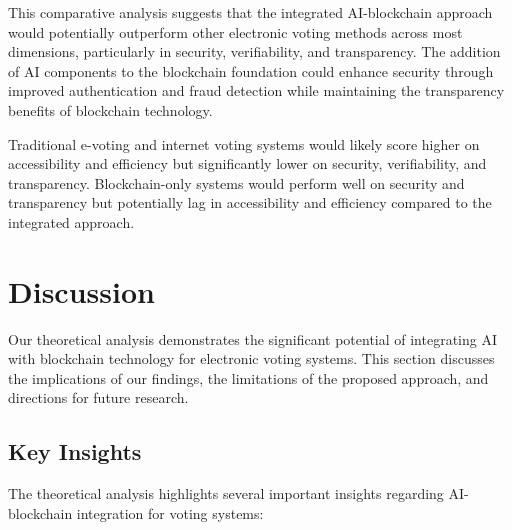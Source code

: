 \documentclass[conference]{IEEEtran}
\begin{document}
This comparative analysis suggests that the integrated AI-blockchain approach would potentially outperform other electronic voting methods across most dimensions, particularly in security, verifiability, and transparency. The addition of AI components to the blockchain foundation could enhance security through improved authentication and fraud detection while maintaining the transparency benefits of blockchain technology.

Traditional e-voting and internet voting systems would likely score higher on accessibility and efficiency but significantly lower on security, verifiability, and transparency. Blockchain-only systems would perform well on security and transparency but potentially lag in accessibility and efficiency compared to the integrated approach.

\section{Discussion}
Our theoretical analysis demonstrates the significant potential of integrating AI with blockchain technology for electronic voting systems. This section discusses the implications of our findings, the limitations of the proposed approach, and directions for future research.

\subsection{Key Insights}
The theoretical analysis highlights several important insights regarding AI-blockchain integration for voting systems:
\end{document}
